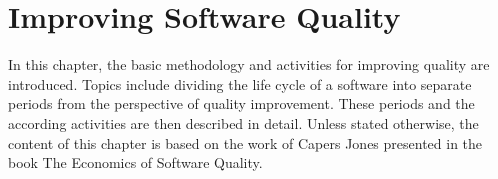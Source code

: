 
 \chapter{Improving Software Quality}

In this chapter, the basic methodology and activities for improving quality are introduced. Topics include dividing the life cycle of a software into separate periods from the perspective of quality improvement. These periods and the according activities are then described in detail. Unless stated otherwise, the content of this chapter is based on the work of Capers Jones presented in the book The Economics of Software Quality.~\cite{jones2011economics}







 

 

 

